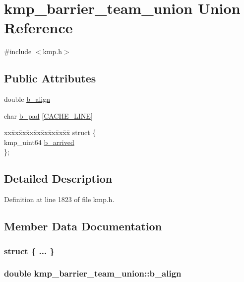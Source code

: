 \hypertarget{unionkmp__barrier__team__union}{\section{kmp\-\_\-barrier\-\_\-team\-\_\-union Union Reference}
\label{unionkmp__barrier__team__union}
}


{\ttfamily \#include $<$kmp.\-h$>$}

\subsection*{Public Attributes}
\begin{DoxyCompactItemize}
\item 
double \hyperlink{unionkmp__barrier__team__union_ae59235d90aeb643a1f3eb3a4450b16ac}{b\-\_\-align}
\item 
char \hyperlink{unionkmp__barrier__team__union_a47bf784cd8d067b5ac62343d45e03b7d}{b\-\_\-pad} \mbox{[}\hyperlink{kmp__os_8h_a86194c659a2d795e5f5949d293ae4661}{C\-A\-C\-H\-E\-\_\-\-L\-I\-N\-E}\mbox{]}
\item 
\begin{tabbing}
xx\=xx\=xx\=xx\=xx\=xx\=xx\=xx\=xx\=\kill
struct \{\\
\>kmp\_uint64 \hyperlink{unionkmp__barrier__team__union_a469318ad3a602e49e4a77b26af50d120}{b\_arrived}\\
\}; \\

\end{tabbing}\end{DoxyCompactItemize}


\subsection{Detailed Description}


Definition at line 1823 of file kmp.\-h.



\subsection{Member Data Documentation}
\hypertarget{unionkmp__barrier__team__union_af2afb6392bebaed16c3d14e88844c333}{\subsubsection[{"@6}]{\setlength{\rightskip}{0pt plus 5cm}struct \{ ... \} }}\label{unionkmp__barrier__team__union_af2afb6392bebaed16c3d14e88844c333}
\hypertarget{unionkmp__barrier__team__union_ae59235d90aeb643a1f3eb3a4450b16ac}{
\subsubsection[{b\-\_\-align}]{\setlength{\rightskip}{0pt plus 5cm}double kmp\-\_\-barrier\-\_\-team\-\_\-union\-::b\-\_\-align}}\label{unionkmp__barrier__team__union_ae59235d90aeb643a1f3eb3a4450b16ac}


